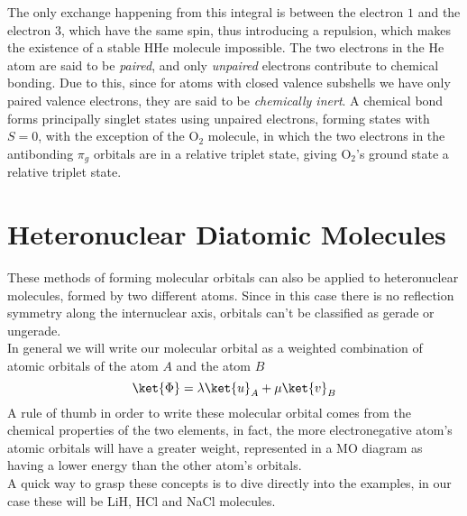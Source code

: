 \documentclass[a4paper, 11pt]{book}
\newcommand{\1}{\opr{\mathds{1}}}
\theoremstyle{plain}
\begin{document}
	The only exchange happening from this integral is between the electron $1$ and the electron $3$, which have the same spin, thus introducing a repulsion, which makes the existence of a stable $\mathrm{HHe}$ molecule impossible. The two electrons in the He atom are said to be \textit{paired}, and only \textit{unpaired} electrons contribute to chemical bonding. Due to this, since for atoms with closed valence subshells we have only paired valence electrons, they are said to be \textit{chemically inert}. A chemical bond forms principally singlet states using unpaired electrons, forming states with $S=0$, with the exception of the  $\mathrm{O}_2$ molecule, in which the two electrons in the antibonding $\pi_g$ orbitals are in a relative triplet state, giving $\mathrm{O}_2$'s ground state a relative triplet state.
	\section{Heteronuclear Diatomic Molecules}
	These methods of forming molecular orbitals can also be applied to heteronuclear molecules, formed by two different atoms. Since in this case there is no reflection symmetry along the internuclear axis, orbitals can't be classified as gerade or ungerade.\\
	In general we will write our molecular orbital as a weighted combination of atomic orbitals of the atom $A$ and the atom $B$
	\begin{equation}
		\ket{\Phi}=\lambda\ket{u}_A+\mu\ket{v}_B
		\label{eq:heteromolorb}
	\end{equation}
	A rule of thumb in order to write these molecular orbital comes from the chemical properties of the two elements, in fact, the more electronegative atom's atomic orbitals will have a greater weight, represented in a MO diagram as having a lower energy than the other atom's orbitals.\\
	A quick way to grasp these concepts is to dive directly into the examples, in our case these will be LiH, HCl and NaCl molecules.
\end{document}
